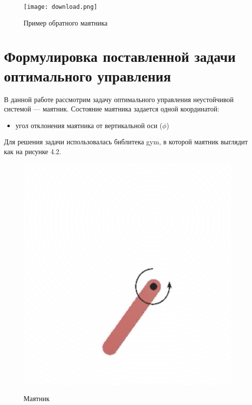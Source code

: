 \begin{figure}[!h]
	\caption {Пример обратного маятника}
	\centering
	\texttt{[image: download.png]}
	\label{fig:agent}
\end{figure}



\section{Формулировка поставленной задачи оптимального управления}\label{1sec:optimal-control}

В данной работе рассмотрим задачу оптимального управления неустойчивой системой — маятник. Состояние маятника задается одной координатой: 

\begin{itemize}
    \item угол отклонения маятника от вертикальной оси ($\phi$)
\end{itemize}

Для решения задачи использовалась библитека gym, в которой маятник выглядит как на рисунке 4.2. \newpage

\begin{figure}[!h]
\caption {Маятник}
	\centering
	\includegraphics[scale=0.4]{pend.png}
	\label{fig:agent}
\end{figure}


